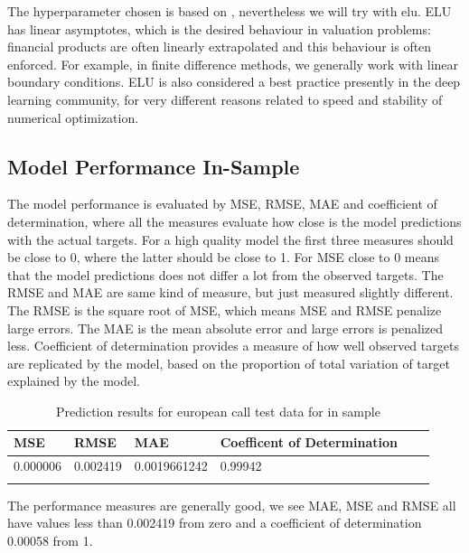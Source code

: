 The hyperparameter chosen is based on \parencite{HirsaAli2019}, nevertheless we will try with elu. ELU has linear asymptotes, which is the desired behaviour in valuation problems: financial products are often linearly extrapolated and this behaviour is often enforced. For example, in finite difference methods, we generally work with linear boundary conditions. ELU is also considered a best practice presently in the deep learning community, for very different reasons related to speed and stability of numerical optimization.



\subsection{Model Performance In-Sample}
The model performance is evaluated by MSE, RMSE, MAE and coefficient of determination, where all the measures evaluate how close is the model predictions with the actual targets. For a high quality model the first three measures should be close to 0, where the latter should be close to 1. For MSE close to 0 means that the model predictions does not differ a lot from the observed targets. The RMSE and MAE are same kind of measure, but just measured slightly different. The RMSE is the square root of MSE, which means MSE and RMSE penalize large errors. The MAE is the mean absolute error and large errors is penalized less. Coefficient of determination provides a measure of how well observed targets are replicated by the model, based on the proportion of total variation of target explained by the model.

\begin{table}[th]
\caption{Prediction results for european call test data for in sample}
\label{tab:euroParRange}
\centering
\begin{tabular}{l l l l l l }
\toprule
\textbf{MSE} & \textbf{RMSE} & \textbf{MAE} & \textbf{Coefficent of Determination} \\
\midrule
0.000006 & 0.002419 & 0.0019661242 & 0.99942\\
\bottomrule\\
\end{tabular}
\end{table}

The performance measures are generally good, we see MAE, MSE and RMSE all have values less than 0.002419 from zero and a coefficient of determination 0.00058 from 1. 

